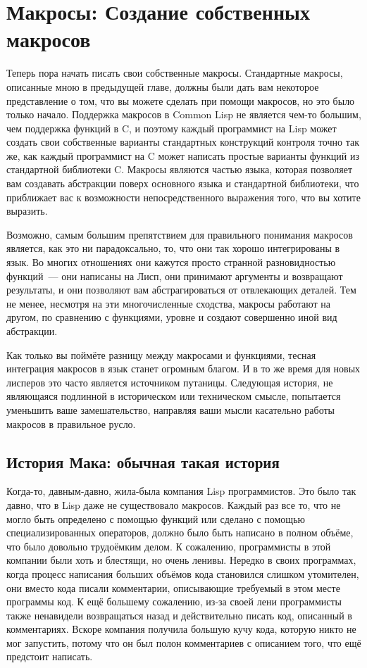 \chapter{Макросы: Создание собственных макросов}
\label{ch:08}

Теперь пора начать писать свои собственные макросы. Стандартные макросы, описанные мною в
предыдущей главе, должны были дать вам некоторое представление о том, что вы можете
сделать при помощи макросов, но это было только начало. Поддержка макросов в Common Lisp
не является чем-то большим, чем поддержка функций в C, и поэтому каждый программист на
Lisp может создать свои собственные варианты стандартных конструкций контроля точно так
же, как каждый программист на C может написать простые варианты функций из стандартной
библиотеки C. Макросы являются частью языка, которая позволяет вам создавать абстракции
поверх основного языка и стандартной библиотеки, что приближает вас к возможности
непосредственного выражения того, что вы хотите выразить.

Возможно, самым большим препятствием для правильного понимания макросов является, как это
ни парадоксально, то, что они так хорошо интегрированы в язык. Во многих отношениях они
кажутся просто странной разновидностью функций~--- они написаны на Лисп, они принимают
аргументы и возвращают результаты, и они позволяют вам абстрагироваться от отвлекающих
деталей. Тем не менее, несмотря на эти многочисленные сходства, макросы работают на
другом, по сравнению с функциями, уровне и создают совершенно иной вид абстракции.

Как только вы поймёте разницу между макросами и функциями, тесная интеграция макросов в
язык станет огромным благом. И в то же время для новых лисперов это часто является
источником путаницы. Следующая история, не являющаяся подлинной в историческом или
техническом смысле, попытается уменьшить ваше замешательство, направляя ваши мысли
касательно работы макросов в правильное русло.

\section{История Мака: обычная такая история}

Когда-то, давным-давно, жила-была компания Lisp программистов. Это было так давно, что в
Lisp даже не существовало макросов. Каждый раз все то, что не могло быть определено с
помощью функций или сделано с помощью специализированных операторов, должно было быть
написано в полном объёме, что было довольно трудоёмким делом. К сожалению, программисты в
этой компании были хоть и блестящи, но очень ленивы. Нередко в своих программах, когда
процесс написания больших объёмов кода становился слишком утомителен, они вместо кода
писали комментарии, описывающие требуемый в этом месте программы код. К ещё большему
сожалению, из-за своей лени программисты также ненавидели возвращаться назад и
действительно писать код, описанный в комментариях. Вскоре компания получила большую кучу
кода, которую никто не мог запустить, потому что он был полон комментариев с описанием
того, что ещё предстоит написать.

